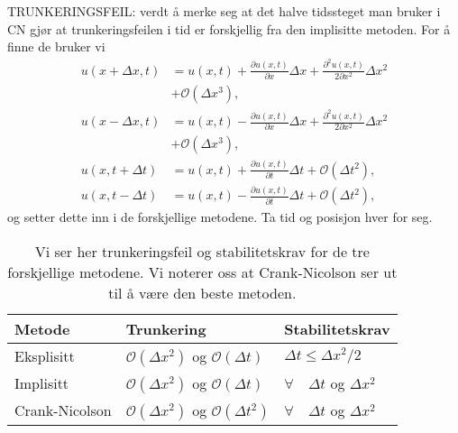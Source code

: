 \documentclass[12pt,a4paper,twocolumn]{article}
\begin{document}
\begin{flushleft}
TRUNKERINGSFEIL: verdt å merke seg at det halve tidssteget man bruker i CN gjør at trunkeringsfeilen i tid er forskjellig fra den implisitte metoden. For å finne de bruker vi
\begin{align}
u(x+\Delta x,t)&=u(x,t)+\frac{\partial u(x,t)}{\partial x} \Delta x+\frac{\partial^2 u(x,t)}{2\partial x^2}\Delta x^2\nonumber\\
&+\mathcal{O}(\Delta x^3),\label{eq:taydeltaxpluss} \\
u(x-\Delta x,t)&=u(x,t)-\frac{\partial u(x,t)}{\partial x}\Delta x+\frac{\partial^2 u(x,t)}{2\partial x^2} \Delta x^2\nonumber\\
&+\mathcal{O}(\Delta x^3), \label{eq:taydeltaxminus} \\
u(x,t+\Delta t)&=u(x,t)+\frac{\partial u(x,t)}{\partial t}\Delta t+  \mathcal{O}(\Delta t^2), \label{eq:taydeltatpluss} \\
u(x,t-\Delta t)&=u(x,t)-\frac{\partial u(x,t)}{\partial t}\Delta t+  \mathcal{O}(\Delta t^2), \label{eq:taydeltatminus}
\end{align}
og setter dette inn i de forskjellige metodene. Ta tid og posisjon hver for seg.
\begin{table}[H]
  \centering
  \begin{tabular}{ l l l }
    \toprule
    Metode & Trunkering & Stabilitetskrav \\
    \midrule
  Eksplisitt & $\mathcal{O}(\Delta x^2)$ og $\mathcal{O}(\Delta t)$ & $\Delta t \leq \Delta x^2/2$ \\
  Implisitt & $\mathcal{O}(\Delta x^2)$ og $\mathcal{O}(\Delta t)$ & $\forall \quad\Delta t$ og $\Delta x^2$ \\
  Crank-Nicolson & $\mathcal{O}(\Delta x^2)$ og $\mathcal{O}(\Delta t^2)$ & $\forall \quad\Delta t$ og $\Delta x^2$ \\
    \bottomrule
  \end{tabular}
  \caption{Vi ser her trunkeringsfeil og stabilitetskrav for de tre forskjellige metodene. Vi noterer oss at Crank-Nicolson ser ut til å være den beste metoden.}
  \label{tab:trunkering}
\end{table}


\end{flushleft}
\end{document}
